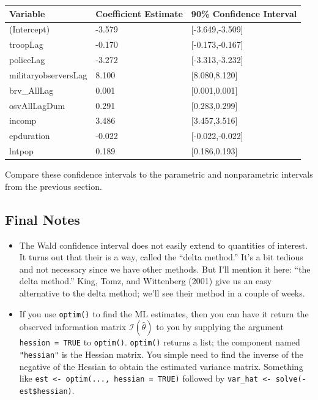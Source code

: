 \documentclass[
]{book}
\providecommand{\tightlist}{%
  \setlength{\itemsep}{0pt}\setlength{\parskip}{0pt}}
\begin{document}
\begin{longtable}[]{@{}lll@{}}
\toprule
Variable & Coefficient Estimate & 90\% Confidence Interval \\
\midrule
\endhead
(Intercept) & -3.579 & {[}-3.649,-3.509{]} \\
troopLag & -0.170 & {[}-0.173,-0.167{]} \\
policeLag & -3.272 & {[}-3.313,-3.232{]} \\
militaryobserversLag & 8.100 & {[}8.080,8.120{]} \\
brv\_AllLag & 0.001 & {[}0.001,0.001{]} \\
osvAllLagDum & 0.291 & {[}0.283,0.299{]} \\
incomp & 3.486 & {[}3.457,3.516{]} \\
epduration & -0.022 & {[}-0.022,-0.022{]} \\
lntpop & 0.189 & {[}0.186,0.193{]} \\
\bottomrule
\end{longtable}

Compare these confidence intervals to the parametric and nonparametric intervals from the previous section.

\hypertarget{final-notes}{%
\subsection{Final Notes}\label{final-notes}}

\begin{itemize}
\tightlist
\item
  The Wald confidence interval does not easily extend to quantities of interest. It turns out that their is a way, called the ``delta method.'' It's a bit tedious and not necessary since we have other methods. But I'll mention it here: ``the delta method.'' King, Tomz, and Wittenberg (2001) give us an easy alternative to the delta method; we'll see their method in a couple of weeks.
\item
  If you use \texttt{optim()} to find the ML estimates, then you can have it return the observed information matrix \(\mathcal{I}(\hat{\theta})\) to you by supplying the argument \texttt{hession\ =\ TRUE} to \texttt{optim()}. \texttt{optim()} returns a list; the component named \texttt{"hessian"} is the Hessian matrix. You simple need to find the inverse of the negative of the Hessian to obtain the estimated variance matrix. Something like \texttt{est\ \textless{}-\ optim(...,\ hessian\ =\ TRUE)} followed by \texttt{var\_hat\ \textless{}-\ solve(-est\$hessian)}.
\end{itemize}
\end{document}
